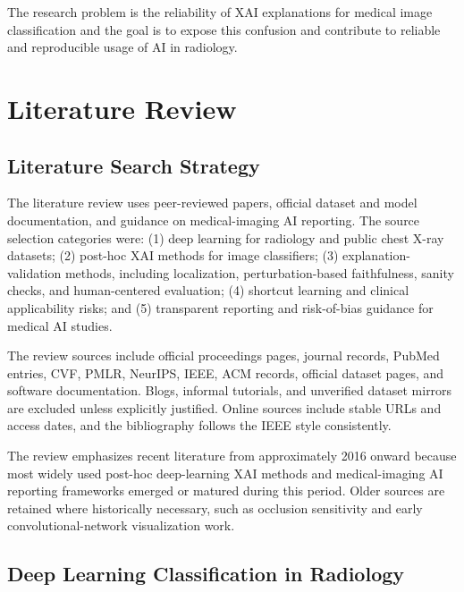 The research problem is the reliability of XAI explanations for medical
image classification and the goal is to expose this confusion and contribute
to reliable and reproducible usage of AI in radiology.

\hypertarget{literature-review}{%
	\chapter{Literature Review}\label{literature-review}}

\hypertarget{literature-search-strategy}{%
	\section{Literature Search Strategy}\label{literature-search-strategy}}

The literature review uses peer-reviewed papers, official dataset and model
documentation, and guidance on medical-imaging AI reporting. The source selection categories were: (1) deep learning for radiology and public chest
X-ray datasets; (2) post-hoc XAI methods for image classifiers; (3)
explanation-validation methods, including localization,
perturbation-based faithfulness, sanity checks, and human-centered
evaluation; (4) shortcut learning and clinical applicability risks; and
(5) transparent reporting and risk-of-bias guidance for medical AI
studies.

The review sources include official proceedings pages,
journal records, PubMed entries,
CVF, PMLR, NeurIPS, IEEE, ACM records, official dataset pages, and
software documentation. Blogs, informal tutorials, and unverified
dataset mirrors are excluded unless explicitly justified. Online sources
include stable URLs and access dates, and the bibliography follows the
IEEE style consistently.

The review emphasizes recent literature from approximately 2016 onward
because most widely used post-hoc deep-learning XAI methods and
medical-imaging AI reporting frameworks emerged or matured during this
period. Older sources are retained where historically necessary, such as
occlusion sensitivity and early convolutional-network visualization
work.

\hypertarget{deep-learning-classification-in-radiology}{%
	\section{Deep Learning Classification in
		Radiology}\label{deep-learning-classification-in-radiology}}

